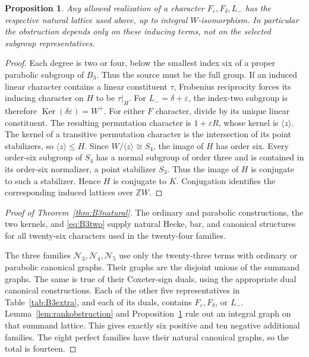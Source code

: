 \documentclass[11pt]{article}
\numberwithin{equation}{section}
\newtheorem{proposition}[theorem]{Proposition}
\theoremstyle{definition}
\DeclareMathOperator{\Ker}{Ker}
\newcommand{\Z}{\mathbb Z}
\newcommand{\ee}{\varepsilon}
\newcommand{\dd}{\delta}
\begin{document}
\begin{proposition}\label{prop:intrinsicB3}
Any allowed realization of a character \(F_\ee,F_\dd,L_-\) has the respective natural lattice used above, up to integral \(W\)-isomorphism.
In particular the obstruction depends only on these inducing terms, not on the selected subgroup representatives.
\end{proposition}
\begin{proof}
Each degree is two or four, below the smallest index six of a proper parabolic subgroup of \(B_3\).
Thus the source must be the full group.
If an induced linear character contains a linear constituent \(\tau\), Frobenius reciprocity forces its inducing character on \(H\) to be \(\tau|_H\).
For \(L_-=\dd+\ee\), the index-two subgroup is therefore \(\Ker(\dd\ee)=W^+\).
For either \(F\) character, divide by its unique linear constituent.
The resulting permutation character is \(1+\ee R\), whose kernel is \(\langle z\rangle\).
The kernel of a transitive permutation character is the intersection of its point stabilizers, so \(\langle z\rangle\leq H\).
Since \(W/\langle z\rangle\cong S_4\), the image of \(H\) has order six.
Every order-six subgroup of \(S_4\) has a normal subgroup of order three and is contained in its order-six normalizer, a point stabilizer \(S_3\).
Thus the image of \(H\) is conjugate to such a stabilizer.
Hence \(H\) is conjugate to \(K\).
Conjugation identifies the corresponding induced lattices over \(\Z W\).
\end{proof}

\begin{proof}[Proof of Theorem~\ref{thm:B3natural}]
The ordinary and parabolic constructions, the two kernels, and \eqref{eq:B3two} supply natural Hecke, bar, and canonical structures for all twenty-six characters used in the twenty-four families.

The three families \(\mathscr N_3,\mathscr N_4,\mathscr N_5\) use only the twenty-three terms with ordinary or parabolic canonical graphs.
Their graphs are the disjoint unions of the summand graphs.
The same is true of their Coxeter-sign duals, using the appropriate dual canonical constructions.
Each of the other five representatives in Table~\ref{tab:B3extra}, and each of its duals, contains \(F_\ee,F_\dd\), or \(L_-\).
Lemma~\ref{lem:rankobstruction} and Proposition~\ref{prop:intrinsicB3} rule out an integral graph on that summand lattice.
This gives exactly six positive and ten negative additional families.
The eight perfect families have their natural canonical graphs, so the total is fourteen.
\end{proof}
\end{document}
